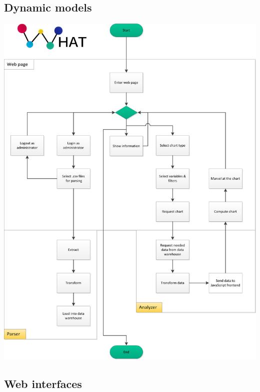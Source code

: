 \subsection{Dynamic models}
\begin{center}
\includegraphics[width=0.85\linewidth]{Pictures/Flow1.png}
\end{center} 

\newpage
\subsection{Web interfaces}
